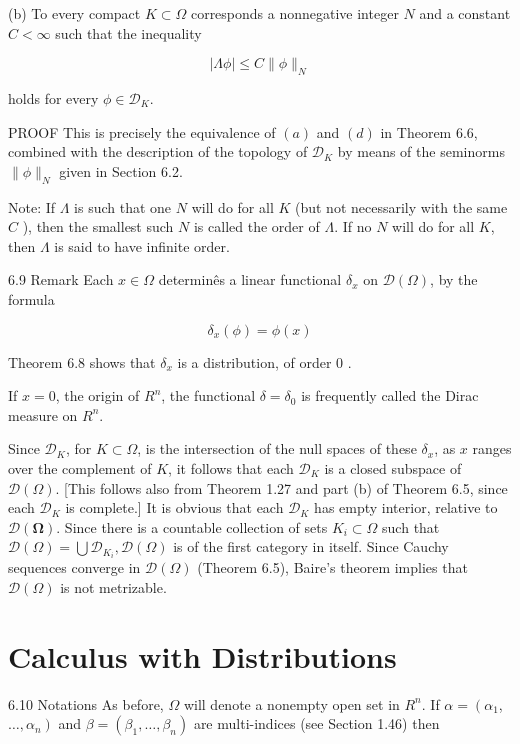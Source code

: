 \documentclass[10pt]{article}
\begin{document}
(b) To every compact $K \subset \Omega$ corresponds a nonnegative integer $N$ and a constant $C<\infty$ such that the inequality

$$
|\Lambda \phi| \leq C\|\phi\|_{N}
$$

holds for every $\phi \in \mathscr{D}_{K}$.

PROOF This is precisely the equivalence of $(a)$ and $(d)$ in Theorem 6.6, combined with the description of the topology of $\mathscr{D}_{K}$ by means of the seminorms $\|\phi\|_{N}$ given in Section 6.2.

Note: If $\Lambda$ is such that one $N$ will do for all $K$ (but not necessarily with the same $C$ ), then the smallest such $N$ is called the order of $\Lambda$. If no $N$ will do for all $K$, then $\Lambda$ is said to have infinite order.

6.9 Remark Each $x \in \Omega$ determinês a linear functional $\delta_{x}$ on $\mathscr{D}(\Omega)$, by the formula

$$
\delta_{x}(\phi)=\phi(x)
$$

Theorem 6.8 shows that $\delta_{x}$ is a distribution, of order 0 .

If $x=0$, the origin of $R^{n}$, the functional $\delta=\delta_{0}$ is frequently called the Dirac measure on $R^{n}$.

Since $\mathscr{D}_{K}$, for $K \subset \Omega$, is the intersection of the null spaces of these $\delta_{x}$, as $x$ ranges over the complement of $K$, it follows that each $\mathscr{D}_{K}$ is a closed subspace of $\mathscr{D}(\Omega)$. [This
follows also from Theorem 1.27 and part (b) of Theorem 6.5, since each $\mathscr{D}_{K}$ is complete.] It is obvious that each $\mathscr{D}_{K}$ has empty interior, relative to $\mathscr{D}(\boldsymbol{\Omega})$. Since there is a countable collection of sets $K_{i} \subset \Omega$ such that $\mathscr{D}(\Omega)=\bigcup \mathscr{D}_{K_{i}}, \mathscr{D}(\Omega)$ is of the first category in itself. Since Cauchy sequences converge in $\mathscr{D}(\Omega)$ (Theorem 6.5), Baire's theorem implies that $\mathscr{D}(\Omega)$ is not metrizable.

\section{Calculus with Distributions}
6.10 Notations As before, $\Omega$ will denote a nonempty open set in $R^{n}$. If $\alpha=\left(\alpha_{1}\right.$, $\left.\ldots, \alpha_{n}\right)$ and $\beta=\left(\beta_{1}, \ldots, \beta_{n}\right)$ are multi-indices (see Section 1.46) then
\end{document}
